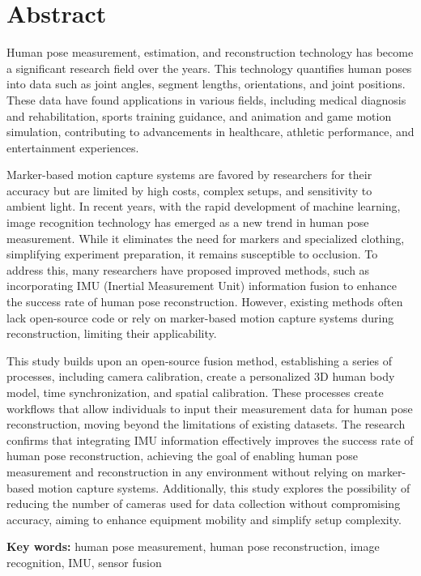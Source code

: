\chapter{Abstract}

Human pose measurement, estimation, and reconstruction technology has become a significant research field over the years. This technology quantifies human poses into data such as joint angles, segment lengths, orientations, and joint positions. These data have found applications in various fields, including medical diagnosis and rehabilitation, sports training guidance, and animation and game motion simulation, contributing to advancements in healthcare, athletic performance, and entertainment experiences.

Marker-based motion capture systems are favored by researchers for their accuracy but are limited by high costs, complex setups, and sensitivity to ambient light. In recent years, with the rapid development of machine learning, image recognition technology has emerged as a new trend in human pose measurement. While it eliminates the need for markers and specialized clothing, simplifying experiment preparation, it remains susceptible to occlusion. To address this, many researchers have proposed improved methods, such as incorporating IMU (Inertial Measurement Unit) information fusion to enhance the success rate of human pose reconstruction. However, existing methods often lack open-source code or rely on marker-based motion capture systems during reconstruction, limiting their applicability.

This study builds upon an open-source fusion method, establishing a series of processes, including camera calibration, create a personalized 3D human body model, time synchronization, and spatial calibration. These processes create workflows that allow individuals to input their measurement data for human pose reconstruction, moving beyond the limitations of existing datasets. The research confirms that integrating IMU information effectively improves the success rate of human pose reconstruction, achieving the goal of enabling human pose measurement and reconstruction in any environment without relying on marker-based motion capture systems. Additionally, this study explores the possibility of reducing the number of cameras used for data collection without compromising accuracy, aiming to enhance equipment mobility and simplify setup complexity.

\bigskip
\textbf{Key words:} human pose measurement, human pose reconstruction, image recognition, IMU, sensor fusion
